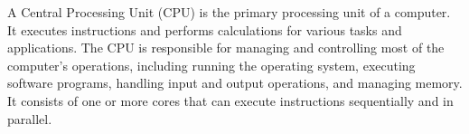 A Central Processing Unit (CPU) is the primary processing unit of a computer. It executes instructions and performs calculations for various tasks and applications. The CPU is responsible for managing and controlling most of the computer’s operations, including running the operating system, executing software programs, handling input and output operations, and managing memory. It consists of one or more cores that can execute instructions sequentially and in parallel. \\